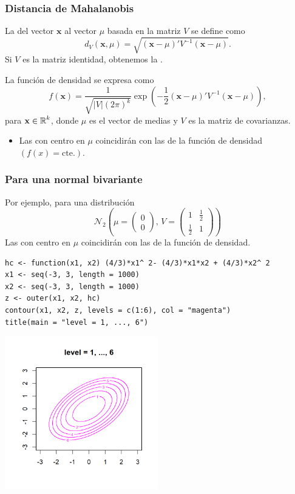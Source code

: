 \subsubsection{Distancia de Mahalanobis}
La  del vector $\mathbf{x}$ al vector $\mu$ basada en la matriz $V$ se define como \[ d_V(\mathbf{x},\mu)=\sqrt{(\mathbf{x}-\mu)'V^{-1}(\mathbf{x}-\mu)}. \]
Si $V$ es la matriz identidad, obtenemos la .

 La función de densidad se expresa como \[ f(\mathbf{x})=\dfrac{1}{\sqrt{|V|(2\pi)^k}}\exp\left(-\dfrac{1}{2}(\mathbf{x}-\mu)'V^{-1}(\mathbf{x}-\mu)\right), \]para $\mathbf{x}\in\operatorname{\mathbb{R}}^k$, donde $\mu$ es el vector de medias y $V$ es la matriz de covarianzas.
\begin{itemize}
	\item Las  con centro en $\mu$ coincidirán con las  de la función de densidad $(f(x)=\mathrm{cte}.).$
\end{itemize}
\subsubsection{Para una \textbf{normal bivariante}}
\begin{minipage}{0.4\textwidth}
	Por ejemplo, para una distribución\[ \mathcal{N}_2\left(\mu=\begin{pmatrix}
		0\\
		0
	\end{pmatrix},\,V=\begin{pmatrix}
	1 & \tfrac{1}{2}\\
	\tfrac{1}{2} & 1
	\end{pmatrix}\right) \]
	Las  con centro en $\mu$ coincidirán con las  de la función de densidad.
\end{minipage}\qquad\begin{minipage}{0.55\textwidth}
\begin{lstlisting}
hc <- function(x1, x2) (4/3)*x1^ 2- (4/3)*x1*x2 + (4/3)*x2^ 2
x1 <- seq(-3, 3, length = 1000)
x2 <- seq(-3, 3, length = 1000)
z <- outer(x1, x2, hc)
contour(x1, x2, z, levels = c(1:6), col = "magenta")
title(main = "level = 1, ..., 6")
\end{lstlisting}
\end{minipage}

\begin{flushright}
	\includegraphics[width=0.5\textwidth]{"Temas/Imágenes/Tema 5/screenshot001"}
\end{flushright}
